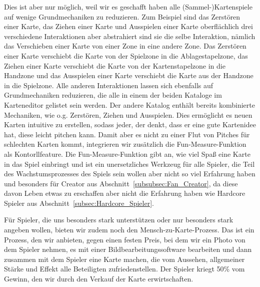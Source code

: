 \documentclass[fontsize=12, a4aper]{scrartcl}
\begin{document}
\noindent Dies ist aber nur möglich, weil wir es geschafft haben alle (Sammel-)Kartenspiele auf wenige Grundmechaniken zu reduzieren. Zum Beispiel sind das Zerstören einer Karte, das Ziehen einer Karte und Ausspielen einer Karte oberflächlich drei verschiedene Interaktionen aber abstrahiert sind sie die selbe Interaktion, nämlich das Verschieben einer Karte von einer Zone in eine andere Zone. Das Zerstören einer Karte verschiebt die Karte von der Spielzone in die Ablagestapelzone, das Ziehen einer Karte verschiebt die Karte von der Kartenstapelzone in die Handzone und das Ausspielen einer Karte verschiebt die Karte aus der Handzone in die Spielzone. Alle anderen Interaktionen lassen sich ebenfalls auf Grundmechaniken reduzieren, die alle in einem der beiden Kataloge im Karteneditor gelistet sein werden. Der andere Katalog enthält bereits kombinierte Mechaniken, wie o.g. Zerstören, Ziehen und Ausspielen. Dies ermöglicht es neuen Karten intuitive zu erstellen, sodass jeder, der denkt, dass er eine gute Kartenidee hat, diese leicht pitchen kann. Damit aber es nicht zu einer Flut von Pitches für schlechten Karten kommt, integrieren wir zusätzlich die \glqq Fun-Measure-Funktion\grqq{} als Kontorllfeature. Die \glqq Fun-Measure-Funktion\grqq{} gibt an, wie viel Spaß eine Karte in das Spiel einbringt und ist ein unersetzliches Werkzeug für alle Spieler, die Teil des Wachstumsprozesses des Spiels sein wollen aber nicht so viel Erfahrung haben und besonders für \glqq Creator\grqq{} aus Abschnitt~\ref{subsubsec:Fan_Creator}, da diese davon Leben etwas zu erschaffen aber nicht die Erfahrung haben wie \glqq Hardcore Spieler\grqq{} aus Abschnitt~\ref{subsec:Hardcore_Spieler}.\hfill\newline

\noindent Für Spieler, die uns besonders stark unterstützen oder nur besonders stark angeben wollen, bieten wir zudem noch den \glqq Mensch-zu-Karte-Prozess\grqq{}. Das ist ein Prozess, den wir anbieten, gegen einen festen Preis, bei dem wir ein Photo von dem Spieler nehmen, es mit einer Bildbearbeitungssoftware bearbeiten und dann zusammen mit dem Spieler eine Karte machen, die vom Aussehen, allgemeiner Stärke und Effekt alle Beteiligten zufriedenstellen. Der Spieler kriegt 50\% vom Gewinn, den wir durch den Verkauf der Karte erwirtschaften.\hfill\newline

\end{document}
